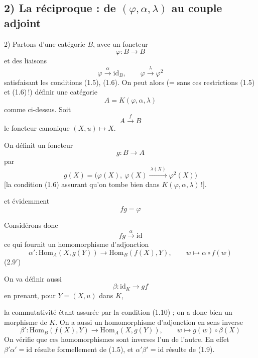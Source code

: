 \documentclass[11pt,a4paper]{article}
\begin{document}
\subsection*{2) La réciproque : de $(\varphi,\alpha,\lambda)$ au couple adjoint}

2) Partons d'une catégorie $B$, avec un foncteur
\[
  \varphi : B \longrightarrow B
  \tag{2.1}
\]
 et des liaisons
\[
  \varphi \xrightarrow{\ \alpha\ } \mathrm{id}_{B} , \qquad
  \varphi \xrightarrow{\ \lambda\ } \varphi^{2}
  \tag{2.2}
\]
satisfaisant les conditions (1.5), (1.6). On peut alors (= sans ces
restrictions (1.5) et (1.6)\,!) définir une catégorie
\[
  A = K(\varphi, \alpha, \lambda)
  \tag{2.3}
\]
comme ci-dessus. Soit
\[
  A \xrightarrow{\ f\ } B
  \tag{2.4}
\]
le foncteur  canonique $(X, u) \mapsto X$.


On définit un foncteur
\[
  g : B \longrightarrow A
  \tag{2.5}
\]
par
\[
  g(X) = \bigl( \varphi(X),\ \varphi(X) \xrightarrow{\ \lambda(X)\ } \varphi^{2}(X) \bigr)
  \tag{2.6}
\]
[la condition  (1.6) assurant qu'on tombe bien dans $K(\varphi,\alpha,\lambda)$\,!].


et  évidemment
\[
  fg = \varphi
  \tag{2.7}
\]

Considérons donc
\[
  fg \xrightarrow{\ \alpha\ } \mathrm{id}
  \tag{2.8}
\]
ce qui fournit un homomorphisme d'adjonction
\[
  \alpha' : \mathrm{Hom}_{A}(X, g(Y)) \longrightarrow \mathrm{Hom}_{B}(f(X), Y) ,
  \qquad w \mapsto \alpha \circ f(w)
  \tag{2.9}
\]
 \quad (2.9$'$)

On va définir aussi
\[
  \beta : \mathrm{id}_{K} \longrightarrow gf
  \tag{2.10}
\]
en prenant, pour $Y = (X, u)$ dans $K$,



la commutativité étant assurée par la condition (1.10) ; on a donc bien un
morphisme de $K$. On a aussi un homomorphisme d'adjonction en sens inverse
\[
  \beta' : \mathrm{Hom}_{B}(f(X), Y) \longrightarrow \mathrm{Hom}_{A}(X, g(Y)) ,
  \qquad w \mapsto g(w) \circ \beta(X)
  \tag{2.11}
\]
On vérifie que ces homomorphismes sont inverses l'un de l'autre. En effet
$\beta' \alpha' = \mathrm{id}$ résulte formellement de (1.5), et
$\alpha' \beta' = \mathrm{id}$ résulte de (1.9).
\end{document}
